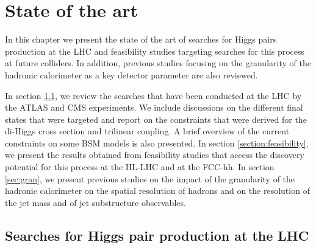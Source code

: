 
\chapter{State of the art}
\label{chapter:state}

In this chapter we present the state of the art of searches for Higgs pairs production at the LHC and  feasibility studies targeting searches for this process at future colliders. In addition, previous studies focusing on the granularity of the hadronic calorimeter as a key detector parameter are also reviewed.

In section \ref{section:previous_searches}, we review the searches that have been conducted at the LHC by the ATLAS and CMS experiments. We include discussions on the different final states that were targeted and report on the constraints that were derived for the di-Higgs cross section and trilinear coupling. A brief overview of the current constraints on some BSM models is also presented. In section \ref{section:feasibility}, we present the results obtained from feasibility studies that access the discovery potential for this process at the HL-LHC and at the FCC-hh. In section \ref{sec:gran}, we present previous studies on the impact of the granularity of the hadronic calorimeter on the spatial resolution of hadrons and on the resolution of the jet mass and of jet substructure observables.

\section{Searches for Higgs pair production at the LHC}
\label{section:previous_searches}
%
%

